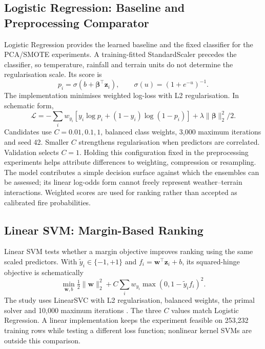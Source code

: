 \documentclass[conference,a4paper]{IEEEtran}
\begin{document}
\subsection{Logistic Regression: Baseline and Preprocessing Comparator}
Logistic Regression provides the learned baseline and the fixed classifier for the PCA/SMOTE experiments. A training-fitted StandardScaler precedes the classifier, so temperature, rainfall and terrain units do not determine the regularisation scale. Its score is
\begin{equation}
p_i=\sigma(b+\boldsymbol\beta^\top\mathbf z_i),\qquad
\sigma(u)=(1+e^{-u})^{-1}.
\end{equation}
The implementation minimises weighted log-loss with L2 regularisation. In schematic form,
\begin{equation}
\mathcal L=-\sum_i w_{y_i}[y_i\log p_i+(1-y_i)\log(1-p_i)]
+\lambda\|\boldsymbol\beta\|_2^2/2.
\end{equation}
Candidates use $C=0.01,0.1,1$, balanced class weights, 3,000 maximum iterations and seed 42. Smaller $C$ strengthens regularisation when predictors are correlated. Validation selects $C=1$. Holding this configuration fixed in the preprocessing experiments helps attribute differences to weighting, compression or resampling. The model contributes a simple decision surface against which the ensembles can be assessed; its linear log-odds form cannot freely represent weather--terrain interactions. Weighted scores are used for ranking rather than accepted as calibrated fire probabilities.

\subsection{Linear SVM: Margin-Based Ranking}
Linear SVM tests whether a margin objective improves ranking using the same scaled predictors. With $\tilde y_i\in\{-1,+1\}$ and $f_i=\mathbf w^\top\mathbf z_i+b$, its squared-hinge objective is schematically
\begin{equation}
\min_{\mathbf w,b}\tfrac12\|\mathbf w\|_2^2+
C\sum_i w_{y_i}\max(0,1-\tilde y_i f_i)^2.
\end{equation}
The study uses LinearSVC with L2 regularisation, balanced weights, the primal solver and 10,000 maximum iterations \citep{cortes,sklearnsvm}. The three $C$ values match Logistic Regression. A linear implementation keeps the experiment feasible on 253,232 training rows while testing a different loss function; nonlinear kernel SVMs are outside this comparison.
\end{document}
